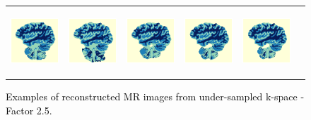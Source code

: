 \documentclass[review]{elsarticle}
\begin{document}
\begin{figure}[H]
\begin{raggedleft}
\begin{tabular}{cccccc}
			\includegraphics[width=2.5cm,height=2.5cm]{include/grp2/factor2/019-Guys-0702-T1/019-Guys-0702-T1_segs__78} &
			\includegraphics[width=2.5cm,height=2.5cm]{include/grp2/factor2/019-Guys-0702-T1/019-Guys-0702-T1_segs__zeroPadding_78} & \includegraphics[width=2.5cm,height=2.5cm]{include/grp2/factor2/019-Guys-0702-T1/019-Guys-0702-T1_segs__CS_78} & \includegraphics[width=2.5cm]{include/grp2/factor2/019-Guys-0702-T1/019-Guys-0702-T1_segs__IMCNNL2TUNE_78} & \includegraphics[width=2.5cm,height=2.5cm]{include/grp2/factor2/019-Guys-0702-T1/019-Guys-0702-T1_segs__predict_78}
			
			
		\end{tabular}
		\par\end{raggedleft}
	\raggedright{}\caption{\textcolor{black}{\footnotesize{}Examples of reconstructed MR images from under-sampled k-space - Factor 2.5.}}
	\label{fig:example_factor_2.5} 
\end{figure}




\end{document}
